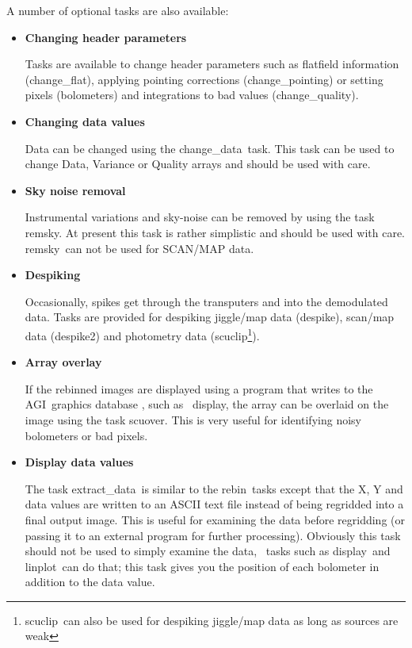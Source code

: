 \documentclass[twoside,11pt]{article}
\newcommand{\Kappa}{\xref{{\sc{Kappa}}}{sun95}{}}
\newcommand{\agi}{\xref{AGI}{sun48}{}}
\newcommand{\task}[1]{{\sf #1}}
\newcommand{\rebin}{\htmlref{\task{rebin}}{REBIN}}
\newcommand{\chgqual}{\htmlref{\task{change\_quality}}{CHANGE_QUALITY}}
\newcommand{\chgflat}{\htmlref{\task{change\_flat}}{CHANGE_FLAT}}
\newcommand{\chgpnt}{\htmlref{\task{change\_pointing}}{CHANGE_POINTING}}
\newcommand{\chgdata}{\htmlref{\task{change\_data}}{CHANGE_DATA}}
\newcommand{\remsky}{\htmlref{\task{remsky}}{REMSKY}}
\newcommand{\scuover}{\htmlref{\task{scuover}}{SCUOVER}}
\newcommand{\extdata}{\htmlref{\task{extract\_data}}{EXTRACT_DATA}}
\newcommand{\despike}{\htmlref{\task{despike}}{DESPIKE}}
\newcommand{\despikeb}{\htmlref{\task{despike2}}{DESPIKE2}}
\newcommand{\scuclip}{\htmlref{\task{scuclip}}{SCUCLIP}}
\newcommand{\display}{\xref{\task{display}}{sun95}{DISPLAY}}
\newcommand{\linplot}{\xref{\task{linplot}}{sun95}{LINPLOT}}
\newcommand{\htmlref}[2]{#1}
\newcommand{\xref}[3]{#1}
\begin{document}
A number of optional tasks are also available:
\begin{itemize}
\item {\bf Changing header parameters}

Tasks are available to change header parameters such as flatfield
information (\chgflat), applying pointing corrections
(\chgpnt) or setting pixels (bolometers) and integrations to bad
values (\chgqual). 

\item {\bf Changing data values}

Data can be changed using the \chgdata\ task. This task can be used to
change Data, Variance or Quality arrays and should be used with
care. 

\item {\bf Sky noise removal}

Instrumental variations and sky-noise can be removed by using the task \remsky.
At present this task is rather simplistic and should be used with care.
\remsky\ can not be used for SCAN/MAP data.

\item {\bf Despiking}

Occasionally, spikes get through the transputers and into the demodulated
data. Tasks are provided for despiking jiggle/map data (\despike),
scan/map data (\despikeb) and photometry data (\scuclip\footnote{\scuclip\
can also be used for despiking jiggle/map data as long as sources are weak}).



\item {\bf Array overlay}

If the rebinned images are displayed using a program that writes to the \agi\
graphics database \cite{agi}, such as \Kappa\ \display, the array can be
overlaid on the image using the task \scuover. This is very useful for
identifying noisy bolometers or bad pixels.

\item{\bf Display data values}

The task \extdata\ is similar to the \rebin\ tasks except that the 
X, Y and data values are written to an ASCII text file instead of 
being regridded into a final output image. This is useful for examining
the data before regridding (or passing it to an external program for
further processing). Obviously this task should not be used to simply
examine the data, \Kappa\ tasks such as \display\ and \linplot\
can do that; this task gives you the position of each bolometer in addition
to the data value.

\end{itemize}
\end{document}

